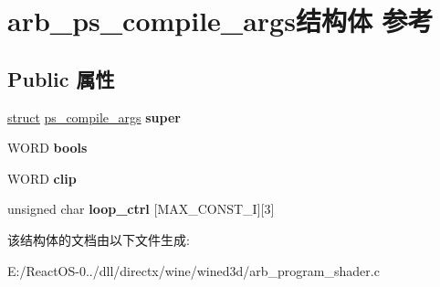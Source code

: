 \hypertarget{structarb__ps__compile__args}{}\section{arb\+\_\+ps\+\_\+compile\+\_\+args结构体 参考}
\label{structarb__ps__compile__args}
\subsection*{Public 属性}
\begin{DoxyCompactItemize}
\item 
\mbox{\label{structarb__ps__compile__args_aeecea35ffd4201dc67d81af9ec23e1f1}} 
\hyperlink{interfacestruct}{struct} \hyperlink{structps__compile__args}{ps\+\_\+compile\+\_\+args} {\bfseries super}
\item 
\mbox{\label{structarb__ps__compile__args_aeb42ced6efb8af59c4c078bfae5c6c17}} 
W\+O\+RD {\bfseries bools}
\item 
\mbox{\label{structarb__ps__compile__args_aeae33ad44f8e6ef11def2e491003d1e7}} 
W\+O\+RD {\bfseries clip}
\item 
\mbox{\label{structarb__ps__compile__args_a567e230848eb0c0ba1620dad3edfc7d0}} 
unsigned char {\bfseries loop\+\_\+ctrl} \mbox{[}M\+A\+X\+\_\+\+C\+O\+N\+S\+T\+\_\+I\mbox{]}\mbox{[}3\mbox{]}
\end{DoxyCompactItemize}


该结构体的文档由以下文件生成\+:\begin{DoxyCompactItemize}
\item 
E\+:/\+React\+O\+S-\/0../dll/directx/wine/wined3d/arb\+\_\+program\+\_\+shader.\+c\end{DoxyCompactItemize}
